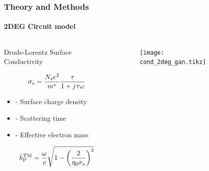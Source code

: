 \documentclass[mathserif,16pt,xcolor=table]{beamer}
\begin{document}
\begin{frame}
  \frametitle{Theory and Methods}
  \framesubtitle{2DEG Circuit model}
  \begin{columns} %
    \begin{column}{.5\textwidth}
      \begin{minipage}[T][.1\textheight][c]{\linewidth}
        \begin{outline}[itemize]
          \1 Drude-Lorentz Surface Conductivity
        \end{outline}
        \begin{equation} \nonumber
          \sigma_s = \frac{N_s e^2}{m^{\ast}}\frac{\tau}{1 + {j}\mkern1mu \tau \omega}
          \label{eq:Y2deg}
        \end{equation}
        \begin{itemize}
          \item[] { - Surface charge density}
          \item[] {\makebox[.3cm][l]{$\tau$} - Scattering time}
          \item[] { - Effective electron mass}
        \end{itemize}
        \begin{equation} \nonumber
          k^{\mathrm{TM}}_{\mathrm P} = \frac{\O}{c} \sqrt{1 - \left(\frac{2}{\eta_0 \sigma_s}\right)^2}
          \label{eq:TM_pole}%
        \end{equation}
      \end{minipage}
    \end{column}
    \begin{column}{.5\textwidth}
      \begin{figure} \vspace*{-1.5cm}
        \texttt{[image: cond\_2deg\_gan.tikz]}
        \label{fig:cond_2deg}
      \end{figure}
      \begin{figure} \vspace*{-1.25cm}
      \end{figure}
      \end{column}%
    \end{columns}
  \end{frame}
\end{document}
